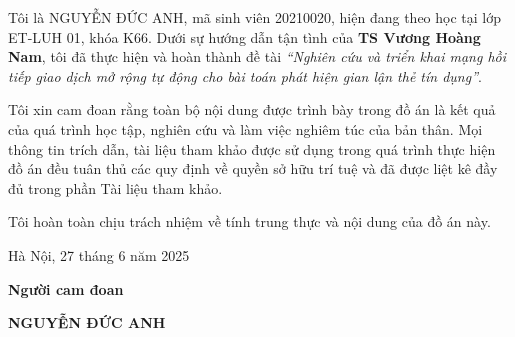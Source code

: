 
Tôi là NGUYỄN ĐỨC ANH, mã sinh viên 20210020, hiện đang theo học tại lớp ET-LUH 01, khóa K66. Dưới sự hướng dẫn tận tình của \textbf{TS Vương Hoàng Nam}, tôi đã thực hiện và hoàn thành đề tài \textit{“Nghiên cứu và triển khai mạng hồi tiếp giao dịch mở rộng tự động cho bài toán phát hiện gian lận thẻ tín dụng”}.

Tôi xin cam đoan rằng toàn bộ nội dung được trình bày trong đồ án là kết quả của quá trình học tập, nghiên cứu và làm việc nghiêm túc của bản thân. Mọi thông tin trích dẫn, tài liệu tham khảo được sử dụng trong quá trình thực hiện đồ án đều tuân thủ các quy định về quyền sở hữu trí tuệ và đã được liệt kê đầy đủ trong phần Tài liệu tham khảo.

Tôi hoàn toàn chịu trách nhiệm về tính trung thực và nội dung của đồ án này.

\vspace{6pt}
\hspace{8.3cm}Hà Nội, 27 tháng 6 năm 2025

\hspace{9cm}\textbf{Người cam đoan}

\vspace{2cm}
\hspace{8.85cm}\textbf{NGUYỄN ĐỨC ANH}
